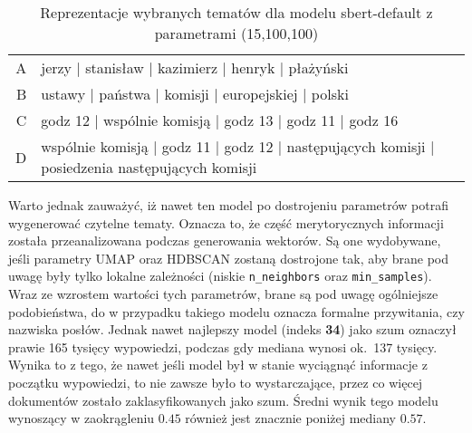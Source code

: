 		\begin{table}[htb]
			\caption{Reprezentacje wybranych tematów dla modelu sbert-default z parametrami (15,100,100)}\label{tab:sbert_default_topics} %
			\centering
			\small
			\begin{tabularx}{\textwidth}{rl}
				\toprule
				A & jerzy | stanisław | kazimierz | henryk | płażyński \\
				B & ustawy | państwa | komisji | europejskiej | polski \\
				C & godz 12 | wspólnie komisją | godz 13 | godz 11 | godz 16 \\
				D & wspólnie komisją | godz 11 | godz 12 | następujących komisji | posiedzenia następujących komisji \\
				\bottomrule
			\end{tabularx}
		\end{table}

		Warto jednak zauważyć, iż nawet ten model po dostrojeniu parametrów potrafi wygenerować czytelne tematy.
		Oznacza to, że część merytorycznych informacji została przeanalizowana podczas generowania wektorów.
		Są one wydobywane, jeśli parametry UMAP oraz HDBSCAN zostaną dostrojone tak,
			aby brane pod uwagę były tylko lokalne zależności (niskie \verb|n_neighbors| oraz \verb|min_samples|).
		Wraz ze wzrostem wartości tych parametrów, brane są pod uwagę ogólniejsze podobieństwa,
			do w przypadku takiego modelu oznacza formalne przywitania, czy nazwiska posłów.
		Jednak nawet najlepszy model (indeks \textbf{34}) jako szum oznaczył prawie 165 tysięcy wypowiedzi, podczas gdy mediana wynosi ok.~137 tysięcy.
		Wynika to z tego, że nawet jeśli model był w stanie wyciągnąć informacje z początku wypowiedzi, to nie zawsze było to wystarczające, przez co więcej dokumentów zostało zaklasyfikowanych jako szum.
		Średni wynik tego modelu wynoszący w zaokrągleniu \(0.45\) również jest znacznie poniżej mediany \(0.57\).

